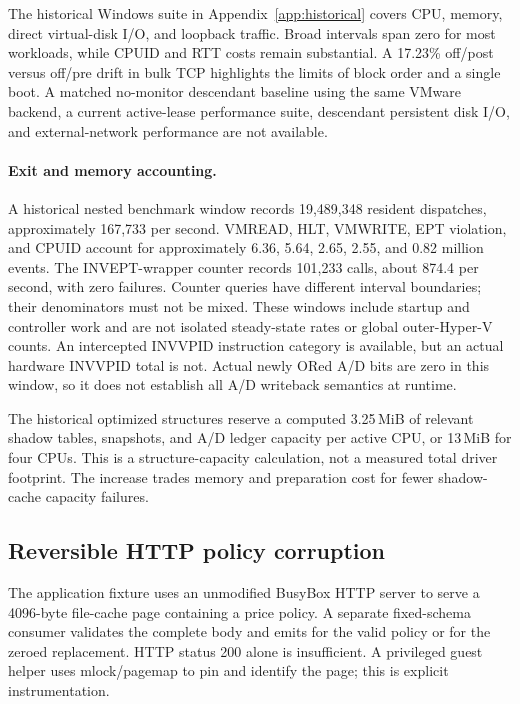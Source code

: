 The historical Windows suite in Appendix~\ref{app:historical} covers CPU, memory,
direct virtual-disk I/O, and loopback traffic. Broad intervals span zero for
most workloads, while CPUID and RTT costs remain substantial. A 17.23\%
off/post versus off/pre drift in bulk TCP highlights the limits of block order
and a single boot. A matched no-monitor descendant baseline using the same
VMware backend, a current active-lease performance suite, descendant persistent
disk I/O, and external-network performance are not available.

\paragraph{Exit and memory accounting.}
A historical nested benchmark window records 19,489,348 resident dispatches,
approximately 167,733 per second. VMREAD, HLT, VMWRITE, EPT violation, and CPUID
account for approximately 6.36, 5.64, 2.65, 2.55, and 0.82 million events.
The INVEPT-wrapper counter records 101,233 calls, about 874.4 per second, with
zero failures. Counter queries have different interval boundaries; their
denominators must not be mixed. These windows include startup and controller
work and are not isolated steady-state rates or global outer-Hyper-V counts.
An intercepted INVVPID instruction category is available, but an actual
hardware INVVPID total is not. Actual newly ORed A/D bits are zero in this
window, so it does not establish all A/D writeback semantics at runtime.

The historical optimized structures reserve a computed 3.25\,MiB of relevant
shadow tables, snapshots, and A/D ledger capacity per active CPU, or 13\,MiB
for four CPUs. This is a structure-capacity calculation, not a measured total
driver footprint. The increase trades memory and preparation cost for fewer
shadow-cache capacity failures.

\subsection{Reversible HTTP policy corruption}
\label{sec:application}
The application fixture uses an unmodified BusyBox HTTP server to serve a
4096-byte file-cache page containing a price policy. A separate fixed-schema
consumer validates the complete body and emits  for the valid
policy or  for the zeroed replacement. HTTP status
200 alone is insufficient. A privileged guest helper uses mlock/pagemap to pin
and identify the page; this is explicit instrumentation.

